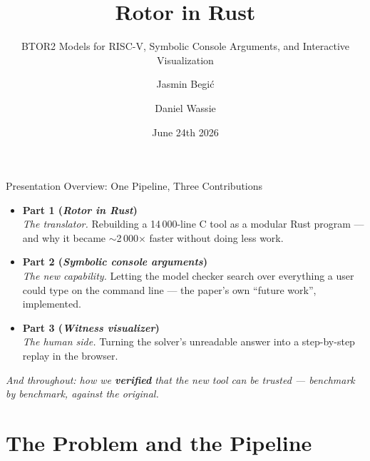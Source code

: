 \documentclass[aspectratio=169]{beamer}
\title{Rotor in Rust}
\subtitle{BTOR2 Models for RISC-V, Symbolic Console Arguments,
          and Interactive Visualization}
\author[J. Begi\'{c} \and D. Wassie]
{Jasmin Begi\'{c} \and Daniel Wassie
 \quad{\small (supervised by Prof.\ Christoph Kirsch)}}
\institute[]
{Paris-Lodron University Salzburg --- Advanced Systems Engineering}
\date{June 24th 2026}
\begin{document}
\begin{frame}
  \titlepage
\end{frame}

\begin{frame}{Presentation Overview: One Pipeline, Three Contributions}
  \begin{itemize}\setlength\itemsep{0.4em}
    \item \textbf{Part 1 (\textit{Rotor in Rust})}\\
          \emph{The translator.} Rebuilding a 14\,000-line C tool as a
          modular Rust program --- and why it became $\sim$2\,000$\times$
          faster without doing less work.
    \item \textbf{Part 2 (\textit{Symbolic console arguments})}\\
          \emph{The new capability.} Letting the model checker search over
          everything a user could type on the command line --- the paper's
          own ``future work'', implemented.
    \item \textbf{Part 3 (\textit{Witness visualizer})}\\
          \emph{The human side.} Turning the solver's unreadable answer
          into a step-by-step replay in the browser.
  \end{itemize}
  \vspace{0.15cm}
  \begin{center}
  \small\itshape
  And throughout: how we \textbf{verified} that the new tool can be
  trusted --- benchmark by benchmark, against the original.
  \end{center}
\end{frame}

\part{The Problem and the Pipeline}
\begin{frame}
  \partpage
\end{frame}
\end{document}
